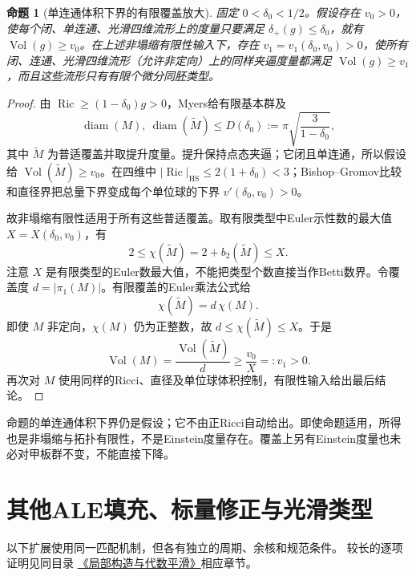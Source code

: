 \documentclass[UTF8,a4paper,11pt,fontset=fandol]{ctexart}
\numberwithin{equation}{section}
\newtheorem{proposition}[theorem]{命题}
\theoremstyle{definition}
\newcommand{\Ric}{\operatorname{Ric}}
\newcommand{\Vol}{\operatorname{Vol}}
\newcommand{\diam}{\operatorname{diam}}
\begin{document}
\begin{proposition}[单连通体积下界的有限覆盖放大]
固定 $0<\delta_0<1/2$。假设存在 $v_0>0$，使每个闭、单连通、光滑四维流形上的度量只要满足 $\delta_+(g)\le\delta_0$，就有 $\Vol(g)\ge v_0$。在上述非塌缩有限性输入下，存在 $v_1=v_1(\delta_0,v_0)>0$，使所有闭、连通、光滑四维流形（允许非定向）上的同样夹逼度量都满足 $\Vol(g)\ge v_1$，而且这些流形只有有限个微分同胚类型。
\end{proposition}
\begin{proof}
由 $\Ric\ge(1-\delta_0)g>0$，Myers给有限基本群及
\[
\diam(M),\ \diam(\widetilde M)\le
D(\delta_0):=\pi\sqrt{\frac3{1-\delta_0}},
\]
其中 $\widetilde M$ 为普适覆盖并取提升度量。提升保持点态夹逼；它闭且单连通，所以假设给 $\Vol(\widetilde M)\ge v_0$。在四维中
$|\Ric|_{\mathrm{HS}}\le2(1+\delta_0)<3$；Bishop--Gromov比较和直径界把总量下界变成每个单位球的下界 $v'(\delta_0,v_0)>0$。

故非塌缩有限性适用于所有这些普适覆盖。取有限类型中Euler示性数的最大值 $X=X(\delta_0,v_0)$，有
\[
2\le\chi(\widetilde M)=2+b_2(\widetilde M)\le X.
\]
注意 $X$ 是有限类型的Euler数最大值，不能把类型个数直接当作Betti数界。令覆盖度 $d=|\pi_1(M)|$。有限覆盖的Euler乘法公式给
\[
\chi(\widetilde M)=d\,\chi(M).
\]
即使 $M$ 非定向，$\chi(M)$ 仍为正整数，故 $d\le\chi(\widetilde M)\le X$。于是
\[
\Vol(M)=\frac{\Vol(\widetilde M)}d\ge\frac{v_0}{X}=:v_1>0.
\]
再次对 $M$ 使用同样的Ricci、直径及单位球体积控制，有限性输入给出最后结论。
\end{proof}
命题的单连通体积下界仍是假设；它不由正Ricci自动给出。即使命题适用，所得也是非塌缩与拓扑有限性，不是Einstein度量存在。覆盖上另有Einstein度量也未必对甲板群不变，不能直接下降。

\section{其他ALE填充、标量修正与光滑类型}
以下扩展使用同一匹配机制，但各有独立的周期、余核和规范条件。
较长的逐项证明见同目录
\href{20260912.tex}{《局部构造与代数平滑》}相应章节。
\end{document}
